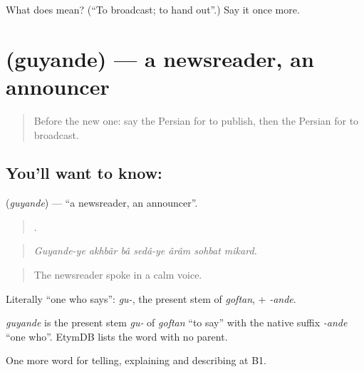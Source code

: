 \begin{tcolorbox}[breakable,colback=teal!4,colframe=teal!35!black,title={Before you move on}]
What does   mean? (\textquotedblleft{}To broadcast; to hand out\textquotedblright{}.) Say it once more.
\end{tcolorbox}
\section[\texorpdfstring{\fa{گوینده} (guyande)}{گوینده (guyande)}]{ (guyande) — a newsreader, an announcer}

\label{lesson:FA-C312-guyande}



\begin{quote}
Before the new one: say the Persian for to publish, then the Persian for to broadcast.
\end{quote}

\subsection*{You'll want to know: }
\textbf{} (\emph{guyande}) — \textquotedblleft{}a newsreader, an announcer\textquotedblright{}.

\begin{quote}
      .
\end{quote}

\begin{quote}
\emph{Guyande-ye akhbâr bâ sedâ-ye ârâm sohbat mikard.}
\end{quote}

\begin{quote}
The newsreader spoke in a calm voice.
\end{quote}

Literally \textquotedblleft{}one who says\textquotedblright{}: \emph{gu-}, the present stem of \emph{goftan}, + \emph{-ande}.

\begin{cousinweb}
\emph{guyande} is the present stem \emph{gu-} of \emph{goftan} \textquotedblleft{}to say\textquotedblright{} with the native suffix \emph{-ande} \textquotedblleft{}one who\textquotedblright{}. EtymDB lists the word with no parent.
\end{cousinweb}

\begin{grammarlens}[title={What you've built}]
One more word for telling, explaining and describing at B1.
\end{grammarlens}

